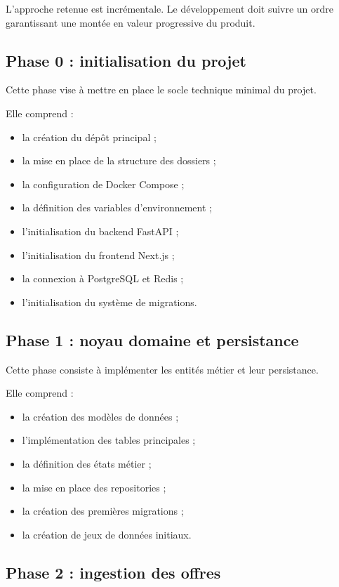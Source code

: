 \documentclass[11pt,a4paper]{article}
\begin{document}
L’approche retenue est incrémentale.  
Le développement doit suivre un ordre garantissant une montée en valeur progressive du produit.

\subsection{Phase 0 : initialisation du projet}

Cette phase vise à mettre en place le socle technique minimal du projet.

Elle comprend :

\begin{itemize}
    \item la création du dépôt principal ;
    \item la mise en place de la structure des dossiers ;
    \item la configuration de Docker Compose ;
    \item la définition des variables d’environnement ;
    \item l’initialisation du backend FastAPI ;
    \item l’initialisation du frontend Next.js ;
    \item la connexion à PostgreSQL et Redis ;
    \item l’initialisation du système de migrations.
\end{itemize}

\subsection{Phase 1 : noyau domaine et persistance}

Cette phase consiste à implémenter les entités métier et leur persistance.

Elle comprend :

\begin{itemize}
    \item la création des modèles de données ;
    \item l’implémentation des tables principales ;
    \item la définition des états métier ;
    \item la mise en place des repositories ;
    \item la création des premières migrations ;
    \item la création de jeux de données initiaux.
\end{itemize}

\subsection{Phase 2 : ingestion des offres}
\end{document}

